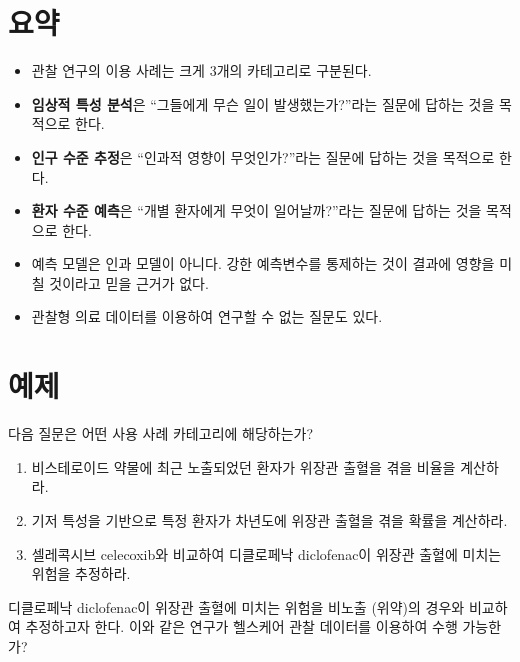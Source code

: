 \documentclass[10.5pt]{book}
\theoremstyle{definition}
\theoremstyle{definition}
\theoremstyle{definition}
\theoremstyle{remark}
\let\BeginKnitrBlock\begin \let\EndKnitrBlock\end
\begin{document}
\section{요약}\label{-5}

\BeginKnitrBlock{rmdsummary}
\begin{itemize}
\item
  관찰 연구의 이용 사례는 크게 3개의 카테고리로 구분된다.
\item
  \textbf{임상적 특성 분석}은 ``그들에게 무슨 일이 발생했는가?''라는
  질문에 답하는 것을 목적으로 한다.
\item
  \textbf{인구 수준 추정}은 ``인과적 영향이 무엇인가?''라는 질문에
  답하는 것을 목적으로 한다.
\item
  \textbf{환자 수준 예측}은 ``개별 환자에게 무엇이 일어날까?''라는
  질문에 답하는 것을 목적으로 한다.
\item
  예측 모델은 인과 모델이 아니다. 강한 예측변수를 통제하는 것이 결과에
  영향을 미칠 것이라고 믿을 근거가 없다.
\item
  관찰형 의료 데이터를 이용하여 연구할 수 없는 질문도 있다.
\end{itemize}
\EndKnitrBlock{rmdsummary}

\section{예제}\label{-3}

\BeginKnitrBlock{exercise}
\protect\hypertarget{exr:exerciseUseCases1}{}{\label{exr:exerciseUseCases1}
}다음 질문은 어떤 사용 사례 카테고리에 해당하는가?

\begin{enumerate}
\def\labelenumi{\arabic{enumi}.}
\item
  비스테로이드 약물에 최근 노출되었던 환자가 위장관 출혈을 겪을 비율을
  계산하라.
\item
  기저 특성을 기반으로 특정 환자가 차년도에 위장관 출혈을 겪을 확률을
  계산하라.
\item
  셀레콕시브 celecoxib와 비교하여 디클로페낙 diclofenac이 위장관 출혈에
  미치는 위험을 추정하라.
\end{enumerate}
\EndKnitrBlock{exercise}

\BeginKnitrBlock{exercise}
\protect\hypertarget{exr:exerciseUseCases2}{}{\label{exr:exerciseUseCases2}
}디클로페낙 diclofenac이 위장관 출혈에 미치는 위험을 비노출 (위약)의
경우와 비교하여 추정하고자 한다. 이와 같은 연구가 헬스케어 관찰 데이터를
이용하여 수행 가능한가?
\EndKnitrBlock{exercise}
\end{document}
